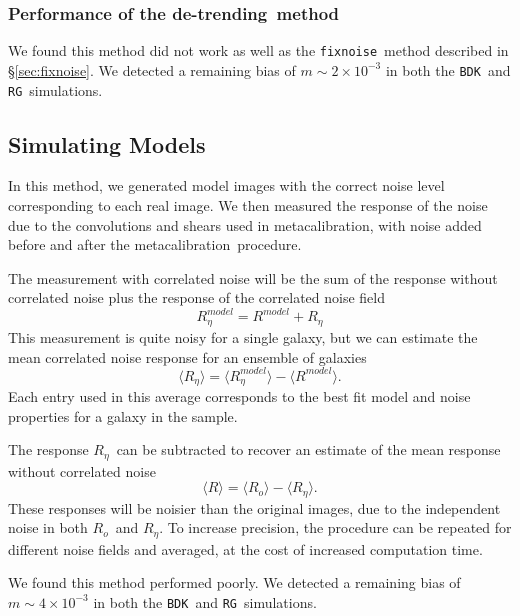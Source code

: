\documentclass[a4paper,fleqn,usenatbib]{mnras}
\newcommand{\mcal}{metacalibration}
\newcommand{\mcalR}{$R$}
\newcommand{\mcalRo}{$R_o$}
\newcommand{\mcalRnoise}{$R_\eta$}
\newcommand{\mcalRmodel}{$R^{model}$}
\newcommand{\mcalRnoisemodel}{$R^{model}_\eta$}
\newcommand{\detrend}{de-trending}
\newcommand{\fixnoise}{\texttt{fixnoise}}
\newcommand{\bdsim}{\texttt{BDK}}
\newcommand{\rgsim}{\texttt{RG}}
\begin{document}
\subsubsection{Performance of the \detrend\ method}

We found this method did not work as well as the \fixnoise\ method
described in \S \ref{sec:fixnoise}.  We detected a remaining bias
of $m \sim 2 \times 10^{-3}$ in both the \bdsim\ and \rgsim\ simulations.

\subsection{Simulating Models}

In this method, we generated model images with the correct noise level corresponding
to each real image.  We then measured the response of the noise due to the
convolutions and shears used in \mcal, with noise added before and
after the \mcal\ procedure.

The measurement with correlated noise will be the sum of the response
without correlated noise plus the response of the correlated noise field
\begin{equation}
    \mbox{\mcalRnoisemodel} = \mbox{\mcalRmodel} + \mbox{\mcalRnoise}
\end{equation}
This measurement is quite noisy for a single galaxy, but we
can estimate the mean correlated noise response for an ensemble
of galaxies
\begin{equation}
    \langle \mbox{\mcalRnoise} \rangle = \langle \mbox{\mcalRnoisemodel} \rangle - \langle \mbox{\mcalRmodel} \rangle.
\end{equation}
Each entry used in this average corresponds to the best fit model
and noise properties for a galaxy in the sample.

The response \mcalRnoise\ can be subtracted to recover an estimate of the mean
response without correlated noise
\begin{equation}
    \langle \mbox{\mcalR} \rangle = \langle \mbox{\mcalRo} \rangle - \langle \mbox{\mcalRnoise} \rangle.
\end{equation}
These responses will be noisier than the original images, due to the
independent noise in both \mcalRo\ and \mcalRnoise.  To increase
precision, the procedure can be repeated for different noise fields
and averaged, at the cost of increased computation time.

We found this method performed poorly.  We detected a remaining bias of  $m
\sim 4 \times 10^{-3}$ in both the \bdsim\ and \rgsim\ simulations.




\end{document}
